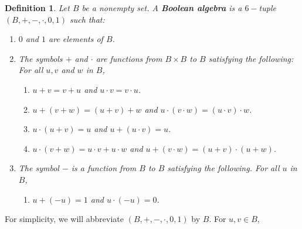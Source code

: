 \documentclass[10pt,longbibliography]{article}
\newtheorem{Def}[Theo]{Definition}
\begin{document}
\begin{Def}\label{Booleanalgebradef}
	 Let $B$ be a nonempty set. A \textbf{Boolean algebra} is a $6-$tuple $(B,+,-,\cdot,0,1)$ such that: 
	\begin{enumerate}
		\item  $0$ and $1$  are elements of $B$.
		\item The symbols $+$ and $\cdot$ are functions from $B \times B$ to $B$ satisfying the following: For all $u,v$ and $w$ in $B$,
		\begin{enumerate}
			\item $u + v = v + u$ and $u \cdot v = v \cdot u$.
			
			\item $u + (v+w) = (u+v)+w$ and $u\cdot (v \cdot w) = (u \cdot v) \cdot w$.
			
			\item  $u\cdot(u+v) = u$ and $u + (u\cdot v) = u$.
			
			\item  $u \cdot(v + w) = u \cdot v + u \cdot w$ and $u+(v \cdot w) = (u+v)\cdot(u+w)$.
		\end{enumerate}
		\item The symbol $-$ is a function from $B$ to $B$ satisfying the following. For all $u$ in $B$,
		\begin{enumerate}
			\item $u + (-u) = 1$ and $u \cdot(-u) = 0$.
		\end{enumerate}
	\end{enumerate}
\end{Def}
For simplicity, we will abbreviate $(B,+,-, \cdot, 0,1)$ by $B$. For $u,v \in B$, 
\end{document}

